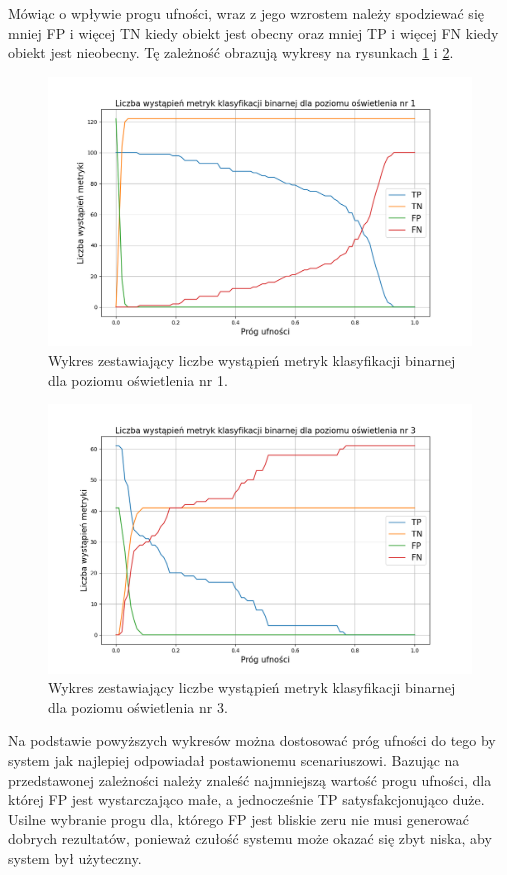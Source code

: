 Mówiąc o wpływie progu ufności, wraz z jego wzrostem należy spodziewać się mniej FP i więcej TN kiedy obiekt jest obecny oraz mniej TP i więcej FN kiedy obiekt jest nieobecny. Tę zależność obrazują wykresy na rysunkach \ref{fig:binary-1} i \ref{fig:binary-3}.
\begin{figure}[H]
    \centering
    \includegraphics[width=\linewidth]{r_test_dokładności/binary_charts/1.png}
    \caption{Wykres zestawiający liczbe wystąpień metryk klasyfikacji binarnej dla poziomu oświetlenia nr 1.}
    \label{fig:binary-1}
\end{figure}
\begin{figure}[H]
    \centering
    \includegraphics[width=\linewidth]{r_test_dokładności/binary_charts/3.png}
    \caption{Wykres zestawiający liczbe wystąpień metryk klasyfikacji binarnej dla poziomu oświetlenia nr 3.}
    \label{fig:binary-3}
\end{figure}
Na podstawie powyższych wykresów można dostosować próg ufności do tego by system jak najlepiej odpowiadał postawionemu scenariuszowi. Bazując na przedstawonej zależności należy znaleść najmniejszą wartość progu ufności, dla której FP jest wystarczająco małe, a jednocześnie TP satysfakcjonująco duże. Usilne wybranie progu dla, którego FP jest bliskie zeru nie musi generować dobrych rezultatów, ponieważ czułość systemu może okazać się zbyt niska, aby system był użyteczny. 

